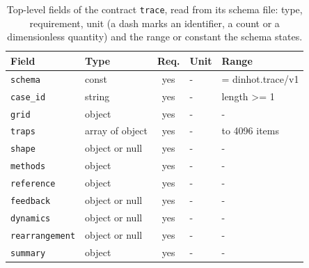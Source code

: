 \begin{table}[t]\centering\footnotesize
\caption{Top-level fields of the contract \texttt{trace}, read from its schema file: type, requirement, unit (a dash marks an identifier, a count or a dimensionless quantity) and the range or constant the schema states.}\label{tab:contract-trace}
\begin{tabular}{@{}l l c l >{\raggedright\arraybackslash}p{}@{}}\toprule Field & Type & Req. & Unit & Range\\\midrule
\texttt{\scriptsize schema} & const & yes & - & = dinhot.trace/v1\\
\texttt{\scriptsize case\_id} & string & yes & - & length >= 1\\
\texttt{\scriptsize grid} & object & yes & - & -\\
\texttt{\scriptsize traps} & array of object & yes & - & 0 to 4096 items\\
\texttt{\scriptsize shape} & object or null & yes & - & -\\
\texttt{\scriptsize methods} & object & yes & - & -\\
\texttt{\scriptsize reference} & object & yes & - & -\\
\texttt{\scriptsize feedback} & object or null & yes & - & -\\
\texttt{\scriptsize dynamics} & object or null & yes & - & -\\
\texttt{\scriptsize rearrangement} & object or null & yes & - & -\\
\texttt{\scriptsize summary} & object & yes & - & -\\
\bottomrule\end{tabular}\end{table}
